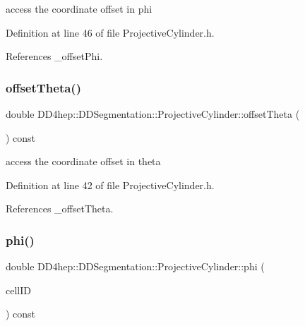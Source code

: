 access the coordinate offset in phi 



Definition at line 46 of file Projective\+Cylinder.\+h.



References \+\_\+offset\+Phi.

\hypertarget{class_d_d4hep_1_1_d_d_segmentation_1_1_projective_cylinder_a84ae02838b7038e926a3354b83a59006}{}\label{class_d_d4hep_1_1_d_d_segmentation_1_1_projective_cylinder_a84ae02838b7038e926a3354b83a59006} 
\subsubsection{\texorpdfstring{offset\+Theta()}{offsetTheta()}}
{\footnotesize\ttfamily double D\+D4hep\+::\+D\+D\+Segmentation\+::\+Projective\+Cylinder\+::offset\+Theta (\begin{DoxyParamCaption}{ }\end{DoxyParamCaption}) const\hspace{0.3cm}{\ttfamily [inline]}}



access the coordinate offset in theta 



Definition at line 42 of file Projective\+Cylinder.\+h.



References \+\_\+offset\+Theta.

\hypertarget{class_d_d4hep_1_1_d_d_segmentation_1_1_projective_cylinder_afa8f12ff739a7cd9dfd980cf341ff5cd}{}\label{class_d_d4hep_1_1_d_d_segmentation_1_1_projective_cylinder_afa8f12ff739a7cd9dfd980cf341ff5cd} 
\subsubsection{\texorpdfstring{phi()}{phi()}\hspace{0.1cm}{\footnotesize\ttfamily [1/2]}}
{\footnotesize\ttfamily double D\+D4hep\+::\+D\+D\+Segmentation\+::\+Projective\+Cylinder\+::phi (\begin{DoxyParamCaption}\item[{const \hyperlink{namespace_d_d4hep_1_1_d_d_segmentation_ac7af071d85cb48820914434a07e21ba1}{Cell\+ID} \&}]{cell\+ID }\end{DoxyParamCaption}) const}



